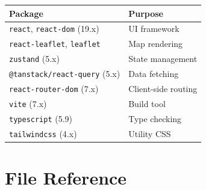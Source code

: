 \documentclass[11pt,a4paper]{article}
\begin{document}
\begin{table}[H]
\centering
\begin{tabular}{ll}
\toprule
\textbf{Package} & \textbf{Purpose} \\
\midrule
\texttt{react}, \texttt{react-dom} (19.x) & UI framework \\
\texttt{react-leaflet}, \texttt{leaflet} & Map rendering \\
\texttt{zustand} (5.x) & State management \\
\texttt{@tanstack/react-query} (5.x) & Data fetching \\
\texttt{react-router-dom} (7.x) & Client-side routing \\
\texttt{vite} (7.x) & Build tool \\
\texttt{typescript} (5.9) & Type checking \\
\texttt{tailwindcss} (4.x) & Utility CSS \\
\bottomrule
\end{tabular}
\end{table}

\newpage
\section{File Reference}
\end{document}
